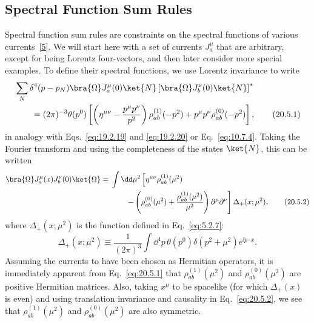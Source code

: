 
\subsection{Spectral Function Sum Rules}

Spectral function sum rules are constraints on the spectral functions of various currents~\hyperref[ch20-ref-5]{[5]}. We will start here with a set of currents $J_a^\mu$ that are arbitrary, except for being Lorentz four-vectors, and then later consider more special examples. To define their spectral functions, we use Lorentz invariance to write
\begin{align}
&\sum_N\delta^4(p-p_N)
\bra{\Omega}J_a^\mu(0)\ket{N}
\left[\bra{\Omega}J_b^\nu(0)\ket{N}\right]^*
\notag\\
&\qquad=(2\pi)^{-3}\theta(p^0)
\left[
\left(\eta^{\mu\nu}-\frac{p^\mu p^\nu}{p^2}\right)
\rho_{ab}^{(1)}(-p^2)
+p^\mu p^\nu\rho_{ab}^{(0)}(-p^2)
\right],
\tag{20.5.1}\label{eq:20.5.1}
\end{align}
in analogy with Eqs.~\eqref{eq:19.2.19} and \eqref{eq:19.2.20} or Eq.~\eqref{eq:10.7.4}. Taking the Fourier transform and using the completeness of the states $\ket{N}$, this can be written
\begin{align}
\bra{\Omega}J_a^\mu(x)J_b^\nu(0)\ket{\Omega}
={}&\int \dd\mu^2
\left[
\eta^{\mu\nu}\rho_{ab}^{(1)}(\mu^2)
\right.
\notag\\
&\left.
\qquad-
\left(
\rho_{ab}^{(0)}(\mu^2)
+\frac{\rho_{ab}^{(1)}(\mu^2)}{\mu^2}
\right)
\partial^\mu\partial^\nu
\right]\Delta_+(x;\mu^2),
\tag{20.5.2}\label{eq:20.5.2}
\end{align}
where $\Delta_+(x;\mu^2)$ is the function defined in Eq.~\eqref{eq:5.2.7}:
\begin{equation}
\Delta_+(x;\mu^2)\equiv
\frac{1}{(2\pi)^3}
\int \dd^4p\,\theta(p^0)\delta(p^2+\mu^2)e^{\ii p\cdot x}.
\tag{20.5.3}\label{eq:20.5.3}
\end{equation}
Assuming the currents to have been chosen as Hermitian operators, it is immediately apparent from Eq.~\eqref{eq:20.5.1} that $\rho_{ab}^{(1)}(\mu^2)$ and $\rho_{ab}^{(0)}(\mu^2)$ are positive Hermitian matrices. Also, taking $x^\mu$ to be spacelike (for which $\Delta_+(x)$ is even) and using translation invariance and causality in Eq.~\eqref{eq:20.5.2}, we see that $\rho_{ab}^{(1)}(\mu^2)$ and $\rho_{ab}^{(0)}(\mu^2)$ are also symmetric.

